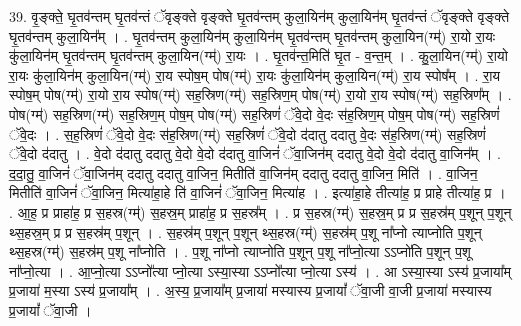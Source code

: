\documentclass[17pt]{extarticle}
\begin{document}
39. वृ॒ङ्क्ते॒ घृ॒तव॑न्तम् घृ॒तव॑न्तं ॅवृङ्क्ते वृङ्क्ते घृ॒तव॑न्तम् कुला॒यिन॑म् कुला॒यिन॑म् घृ॒तव॑न्तं ॅवृङ्क्ते वृङ्क्ते घृ॒तव॑न्तम् कुला॒यिन᳚म् । . घृ॒तव॑न्तम् कुला॒यिन॑म् कुला॒यिन॑म् घृ॒तव॑न्तम् घृ॒तव॑न्तम् कुला॒यिन(ग्म्॑) रा॒यो रा॒यः कु॑ला॒यिन॑म् घृ॒तव॑न्तम् घृ॒तव॑न्तम् कुला॒यिन(ग्म्॑) रा॒यः । . घृ॒तव॑न्त॒मिति॑ घृ॒त - व॒न्त॒म् । . कु॒ला॒यिन(ग्म्॑) रा॒यो रा॒यः कु॑ला॒यिन॑म् कुला॒यिन(ग्म्॑) रा॒य स्पोष॒म् पोष(ग्म्॑) रा॒यः कु॑ला॒यिन॑म् कुला॒यिन(ग्म्॑) रा॒य स्पोष᳚म् । . रा॒य स्पोष॒म् पोष(ग्म्॑) रा॒यो रा॒य स्पोष(ग्म्॑) सह॒स्रिण(ग्म्॑) सह॒स्रिण॒म् पोष(ग्म्॑) रा॒यो रा॒य स्पोष(ग्म्॑) सह॒स्रिण᳚म् । . पोष(ग्म्॑) सह॒स्रिण(ग्म्॑) सह॒स्रिण॒म् पोष॒म् पोष(ग्म्॑) सह॒स्रिणं॑ ॅवे॒दो वे॒दः स॑ह॒स्रिण॒म् पोष॒म् पोष(ग्म्॑) सह॒स्रिणं॑ ॅवे॒दः । . स॒ह॒स्रिणं॑ ॅवे॒दो वे॒दः स॑ह॒स्रिण(ग्म्॑) सह॒स्रिणं॑ ॅवे॒दो द॑दातु ददातु वे॒दः स॑ह॒स्रिण(ग्म्॑) सह॒स्रिणं॑ ॅवे॒दो द॑दातु । . वे॒दो द॑दातु ददातु वे॒दो वे॒दो द॑दातु वा॒जिनं॑ ॅवा॒जिन॑म् ददातु वे॒दो वे॒दो द॑दातु वा॒जिन᳚म् । . द॒दा॒तु॒ वा॒जिनं॑ ॅवा॒जिन॑म् ददातु ददातु वा॒जिन॒ मितीति॑ वा॒जिन॑म् ददातु ददातु वा॒जिन॒ मिति॑ । . वा॒जिन॒ मितीति॑ वा॒जिनं॑ ॅवा॒जिन॒ मित्या॑हा॒हे ति॑ वा॒जिनं॑ ॅवा॒जिन॒ मित्या॑ह । . इत्या॑हा॒हे तीत्या॑ह॒ प्र प्राहे तीत्या॑ह॒ प्र । . आ॒ह॒ प्र प्राहा॑ह॒ प्र स॒हस्र(ग्म्॑) स॒हस्र॒म् प्राहा॑ह॒ प्र स॒हस्र᳚म् । . प्र स॒हस्र(ग्म्॑) स॒हस्र॒म् प्र प्र स॒हस्र॑म् प॒शून् प॒शून् थ्स॒हस्र॒म् प्र प्र स॒हस्र॑म् प॒शून् । . स॒हस्र॑म् प॒शून् प॒शून् थ्स॒हस्र(ग्म्॑) स॒हस्र॑म् प॒शू ना᳚प्नो त्याप्नोति प॒शून् थ्स॒हस्र(ग्म्॑) स॒हस्र॑म् प॒शू ना᳚प्नोति । . प॒शू ना᳚प्नो त्याप्नोति प॒शून् प॒शू ना᳚प्नो॒त्या ऽऽप्नो॑ति प॒शून् प॒शू ना᳚प्नो॒त्या । . आ॒प्नो॒त्या ऽऽप्नो᳚त्या प्नो॒त्या ऽस्या॒स्या ऽऽप्नो᳚त्या प्नो॒त्या ऽस्य॑ । . आ ऽस्या॒स्या ऽस्य॑ प्र॒जाया᳚म् प्र॒जाया॑ म॒स्या ऽस्य॑ प्र॒जाया᳚म् । . अ॒स्य॒ प्र॒जाया᳚म् प्र॒जाया॑ मस्यास्य प्र॒जायां᳚ ॅवा॒जी वा॒जी प्र॒जाया॑ मस्यास्य प्र॒जायां᳚ ॅवा॒जी । \newline
\end{document}
